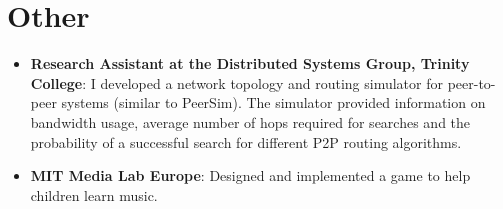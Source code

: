 \documentclass[letterpaper,11pt]{article}
\newcommand{\resumeItem}[2]{
  \item\small{
    \textbf{#1}{: #2 \vspace{-2pt}}
  }
}
\newcommand{\resumeSubItem}[2]{\resumeItem{#1}{#2}\vspace{-4pt}}
\newcommand{\resumeSubHeadingListStart}{\begin{itemize}[leftmargin=*]}
\newcommand{\resumeSubHeadingListEnd}{\end{itemize}}
\begin{document}
\section{Other}
  \resumeSubHeadingListStart
    \resumeSubItem{Research Assistant at the Distributed Systems Group, Trinity College}
      {I developed a network topology and routing simulator for peer-to-peer systems (similar to PeerSim).
The simulator provided information on bandwidth usage, average number of hops required for searches and the probability of a successful search for different P2P routing algorithms.}
    \resumeSubItem{MIT Media Lab Europe}
      {Designed and implemented a game to help children learn music.}
  \resumeSubHeadingListEnd



\end{document}

